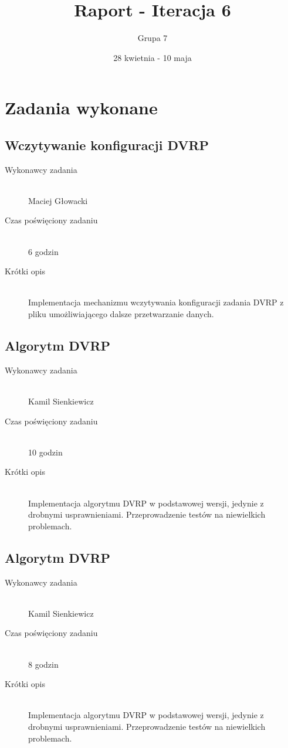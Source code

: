 \documentclass[a4paper]{article}
\title{Raport - Iteracja 6}
\date{28 kwietnia - 10 maja}
\author{Grupa 7}
\begin{document}
\maketitle

\section{Zadania wykonane}
\subsection{Wczytywanie konfiguracji DVRP}
\begin{description}
    \item[Wykonawcy zadania] \hfill \\ Maciej Głowacki
    \item[Czas poświęciony zadaniu] \hfill \\ 6 godzin
    \item[Krótki opis] \hfill \\ Implementacja mechanizmu wczytywania konfiguracji zadania DVRP z pliku umożliwiającego dalsze przetwarzanie danych.
\end{description}

\subsection{Algorytm DVRP}
\begin{description}
    \item[Wykonawcy zadania] \hfill \\ Kamil Sienkiewicz
    \item[Czas poświęciony zadaniu] \hfill \\ 10 godzin
    \item[Krótki opis] \hfill \\ Implementacja algorytmu DVRP w podstawowej wersji, jedynie z drobnymi usprawnieniami. Przeprowadzenie testów na niewielkich problemach.
\end{description}

\subsection{Algorytm DVRP}
\begin{description}
    \item[Wykonawcy zadania] \hfill \\ Kamil Sienkiewicz
    \item[Czas poświęciony zadaniu] \hfill \\ 8 godzin
    \item[Krótki opis] \hfill \\ Implementacja algorytmu DVRP w podstawowej wersji, jedynie z drobnymi usprawnieniami. Przeprowadzenie testów na niewielkich problemach.
\end{description}
\end{document}
